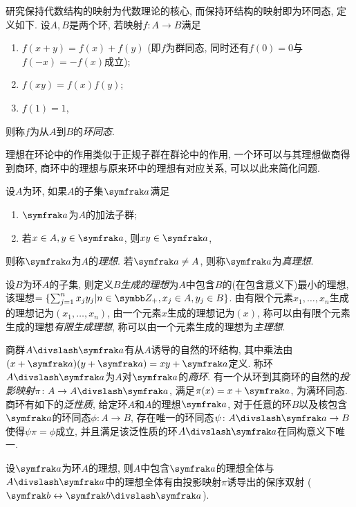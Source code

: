 研究保持代数结构的映射为代数理论的核心, 而保持环结构的映射即为环同态, 定义如下.
设$A, B$是两个环, 若映射$f\colon A\to B$满足
\begin{enumerate}
  \item $f(x+y)=f(x)+f(y)$ (即$f$为群同态, 同时还有$f(0)=0$与$f(-x)=-f(x)$成立);
  \item $f(xy)=f(x)f(y)$;
  \item $f(1)=1$,
\end{enumerate}
则称$f$为从$A$到$B$的\emph{环同态}.

理想在环论中的作用类似于正规子群在群论中的作用, 一个环可以与其理想做商得到商环, 商环中的理想与原来环中的理想有对应关系, 可以以此来简化问题.
\begin{definition}
  设$A$为环, 如果$A$的子集$\ideal{a}$满足
  \begin{enumerate}
    \item $\ideal{a}$为$A$的加法子群;
    \item 若$x\in A, y\in\ideal{a}$, 则$xy\in\ideal{a}$,
  \end{enumerate}
  则称$\ideal{a}$为$A$的\emph{理想}. 若$\ideal{a}\neq A$, 则称$\ideal{a}$为\emph{真理想}\footnotemark .
\end{definition}

设$B$为环$A$的子集, 则定义$B$\emph{生成的理想}为$A$中包含$B$的(在包含意义下)最小的理想, 该理想$=\{\sum_{j=1}^n x_jy_j\vert n\in\ZZ_+, x_j\in A, y_j\in B\}$. 由有限个元素$x_1, \dotsc, x_n$生成的理想记为$(x_1, \dotsc, x_n)$, 由一个元素$x$生成的理想记为$(x)$, 称可以由有限个元素生成的理想\emph{有限生成理想}, 称可以由一个元素生成的理想为\emph{主理想}.

商群$A{\divslash} \ideal{a}$有从$A$诱导的自然的环结构, 其中乘法由$(x+\ideal{a})(y+\ideal{a})=xy+\ideal{a}$定义. 称环$A{\divslash}\ideal{a}$为$A$对$\ideal{a}$的\emph{商环}. 有一个从环到其商环的自然的\emph{投影映射}$\pi\colon A\to A{\divslash}\ideal{a}$, 满足$\pi(x)=x+\ideal{a}$, 为满环同态. 商环有如下的\emph{泛性质}, 给定环$A$和$A$的理想$\ideal{a}$, 对于任意的环$B$以及核包含$\ideal{a}$的环同态$\phi\colon A\to B$, 存在唯一的环同态$\psi\colon A{\divslash}\ideal{a}\to B$使得$\psi\pi=\phi$成立, 并且满足该泛性质的环$A{\divslash}\ideal{a}$在同构意义下唯一.

\begin{proposition}\label{prop:quotidealcorr}
  设$\ideal{a}$为环$A$的理想, 则$A$中包含$\ideal{a}$的理想全体与$A{\divslash}\ideal{a}$中的理想全体有由投影映射$\pi$诱导出的保序双射 ($\ideal{b}\leftrightarrow\ideal{b}{\divslash}\ideal{a}$).
\end{proposition}

